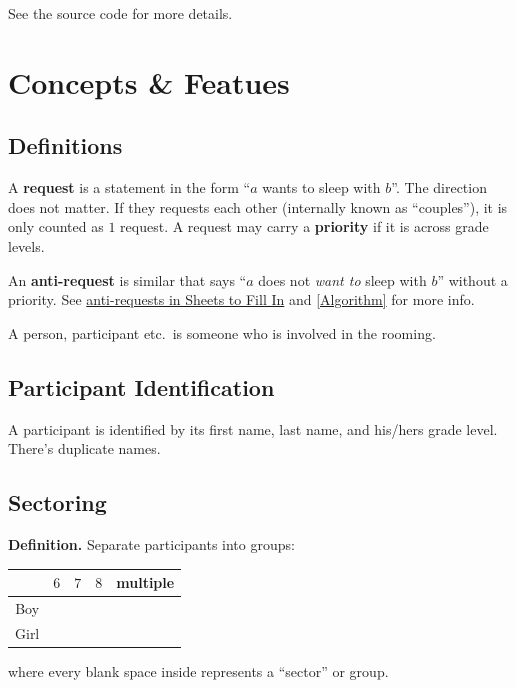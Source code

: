 \documentclass[openany,notitlepage]{book}
\begin{document}
	
	See the source code for more details.
	\section{Concepts \& Featues}
	\subsection{Definitions}
	A \textbf{request} is a statement in the form ``$a$ wants to sleep with $b$''. The direction does not matter. If they
	requests each other (internally known as ``couples''), it is only counted as $1$ request. A request may carry a
	\textbf{priority} if it is across grade levels.  
	
	An \textbf{anti-request} is similar that says ``$a$ does not \emph{want to} sleep with $b$'' without a priority. See
	\hyperref[anti]{anti-requests in Sheets to Fill In} and \ref{Algorithm} for more info. 
	
	A person, participant etc.\ is someone who is involved in the rooming.
	\subsection{Participant Identification}
	A participant is identified by its first name, last name, and his/hers grade level. There's duplicate names.
	\subsection{Sectoring}\label{sect}
	\textbf{Definition.} Separate participants into groups:
	\begin{center}
		\begin{tabular}{c|c c c c}
			&$6$&$7$&$8$&multiple\\ \hline
			Boy&&&&\\
			Girl&&&&
		\end{tabular}
	\end{center}
	where every blank space inside represents a ``sector'' or group. 
	
\end{document}
